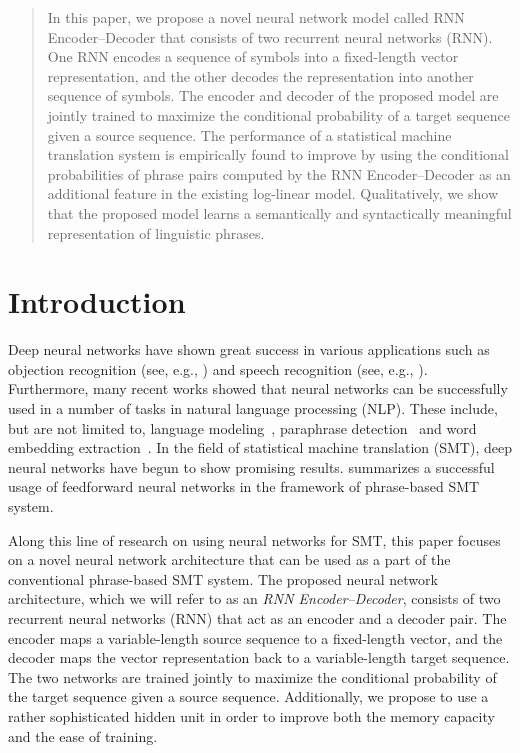 \begin{abstract}
    In this paper, we propose a novel neural network model called RNN
    Encoder--Decoder that consists of two recurrent neural networks (RNN). One
    RNN encodes a sequence of symbols into a fixed-length vector representation,
    and the other decodes the representation into another sequence of symbols.
    The encoder and decoder of the proposed model are jointly trained to
    maximize the conditional probability of a target sequence given a source
    sequence. The performance of a statistical machine translation system is
    empirically found to improve by using the conditional probabilities of
    phrase pairs computed by the RNN Encoder--Decoder as an additional feature
    in the existing log-linear model. Qualitatively, we show that the proposed
    model learns a semantically and syntactically meaningful representation of
    linguistic phrases.
\end{abstract}

\section{Introduction}

Deep neural networks have shown great success in various applications such as
objection recognition (see, e.g., \mbox{\cite{Krizhevsky-2012}}) and speech
recognition (see, e.g., \mbox{\cite{Dahl2012}}). Furthermore, many recent works
showed that neural networks can be successfully used in a number of tasks in
natural language processing (NLP). These include, but are not limited to, language
modeling~\mbox{\cite{Bengio2003lm}}, 
paraphrase detection~\mbox{\cite{SocherEtAl2011:PoolRAE}} and word embedding
extraction~\mbox{\cite{Mikolov2013}}. In the field of statistical machine
translation (SMT), deep neural networks have begun to show promising results.
\mbox{\cite{Schwenk2012}} summarizes a successful usage of feedforward neural
networks in the framework of phrase-based SMT system.

Along this line of research on using neural networks for SMT, this paper
focuses on a novel neural network architecture that can be used as a part
of the conventional phrase-based SMT system. The proposed neural network
architecture, which we will refer to as an \textit{RNN Encoder--Decoder},
consists of two recurrent neural networks (RNN) that act as an encoder and
a decoder pair. The encoder maps a variable-length source sequence to a
fixed-length vector, and the decoder maps the vector representation back
to a variable-length target sequence. The two networks are trained jointly
to maximize the conditional probability of the target sequence given a
source sequence. Additionally, we propose to use a rather sophisticated
hidden unit in order to improve both the memory capacity and the ease of
training.

